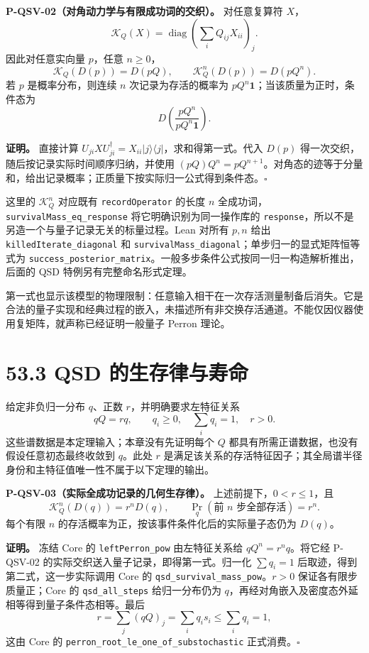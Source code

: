 \documentclass[
  11pt,
  oneside]{book}
\begin{document}
\textbf{P-QSV-02（对角动力学与有限成功词的交织）。} 对任意复算符 \(X\)，
\[
\mathcal K_Q(X)=\operatorname{diag}\left(\sum_iQ_{ij}X_{ii}\right)_j.
\] 因此对任意实向量 \(p\)，任意 \(n\ge0\)， \[
\mathcal K_Q(D(p))=D(pQ),\qquad
\mathcal K_Q^n(D(p))=D(pQ^n).
\] 若 \(p\) 是概率分布，则连续 \(n\) 次记录为存活的概率为
\(pQ^n\mathbf1\)；当该质量为正时，条件态为 \[
D\left(\frac{pQ^n}{pQ^n\mathbf1}\right).
\]

\textbf{证明。} 直接计算
\(U_{ji}XU_{ji}^{\dagger}=X_{ii}|j\rangle\langle j|\)，求和得第一式。代入
\(D(p)\) 得一次交织，随后按记录实际时间顺序归纳，并使用
\((pQ)Q^n=pQ^{n+1}\)。对角态的迹等于分量和，给出记录概率；正质量下按实际归一公式得到条件态。\(\square\)

这里的 \(\mathcal K_Q^n\) 对应既有 \texttt{recordOperator} 的长度 \(n\)
全成功词，\texttt{survivalMass\_\allowbreak eq\_\allowbreak response} 将它明确识别为同一操作库的
\texttt{response}，所以不是另造一个与量子记录无关的标量过程。Lean 对所有
\(p,n\) 给出 \texttt{killedIterate\_\allowbreak diagonal} 和
\texttt{survivalMass\_\allowbreak diagonal}；单步归一的显式矩阵恒等式为
\texttt{success\_\allowbreak posterior\_\allowbreak matrix}。一般多步条件公式按同一归一构造解析推出，后面的
QSD 特例另有完整命名形式定理。

第一式也显示该模型的物理限制：任意输入相干在一次存活测量制备后消失。它是合法的量子实现和经典过程的嵌入，未描述所有非交换存活通道。不能仅因仪器使用复矩阵，就声称已经证明一般量子
Perron 理论。

\hypertarget{qsd-ux7684ux751fux5b58ux5f8bux4e0eux5bffux547d}{%
\section{53.3 QSD
的生存律与寿命}\label{qsd-ux7684ux751fux5b58ux5f8bux4e0eux5bffux547d}}

给定非负归一分布 \(q\)、正数 \(r\)，并明确要求左特征关系 \[
qQ=rq,\qquad q_i\ge0,\quad \sum_iq_i=1,\quad r>0.
\] 这些谱数据是本定理输入；本章没有先证明每个 \(Q\)
都具有所需正谱数据，也没有假设任意初态最终收敛到 \(q\)。此处 \(r\)
是满足该关系的存活特征因子；其全局谱半径身份和主特征值唯一性不属于以下定理的输出。

\protect\hypertarget{p-qsv-03}{}{}

\textbf{P-QSV-03（实际全成功记录的几何生存律）。}
上述前提下，\(0<r\le1\)，且 \[
\mathcal K_Q^n(D(q))=r^nD(q),\qquad
\Pr_q(\text{前 }n\text{ 步全部存活})=r^n.
\] 每个有限 \(n\) 的存活概率为正，按该事件条件化后的实际量子态仍为
\(D(q)\)。

\textbf{证明。} 冻结 Core 的 \texttt{leftPerron\_\allowbreak pow} 由左特征关系给
\(qQ^n=r^nq\)。将它经 P-QSV-02
的实际交织送入量子记录，即得第一式。归一化 \(\sum q_i=1\)
后取迹，得到第二式，这一步实际调用 Core 的
\texttt{qsd\_\allowbreak survival\_\allowbreak mass\_\allowbreak pow}。\(r>0\) 保证各有限步质量正；Core 的
\texttt{qsd\_\allowbreak all\_\allowbreak steps} 给归一分布仍为
\(q\)，再经对角嵌入及密度态外延相等得到量子条件态相等。最后 \[
r=\sum_j(qQ)_j=\sum_iq_is_i\le\sum_iq_i=1,
\] 这由 Core 的 \texttt{perron\_\allowbreak root\_\allowbreak le\_\allowbreak one\_\allowbreak of\_\allowbreak substochastic}
正式消费。\(\square\)
\end{document}
